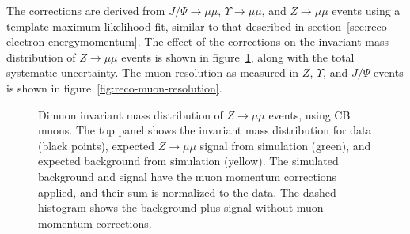 The corrections are derived from $J/\Psi\rightarrow\mu\mu$, $\Upsilon\rightarrow\mu\mu$, and $Z\rightarrow\mu\mu$ events using a template maximum likelihood fit, similar to that described in section~\ref{sec:reco-electron-energymomentum}. The effect of the corrections on the invariant mass distribution of $Z\rightarrow\mu\mu$ events is shown in figure~\ref{fig:reco-muon-momentum-corrections}, along with the total systematic uncertainty. The muon resolution as measured in $Z$, $\Upsilon$, and $J/\Psi$ events is shown in figure~\ref{fig:reco-muon-resolution}.

\begin{figure}[htbp]
	\centering
	\caption{Dimuon invariant mass distribution of $Z\rightarrow\mu\mu$ events, using CB muons. The top panel shows the invariant mass distribution for data (black points), expected $Z\rightarrow\mu\mu$ signal from simulation (green), and expected background from simulation (yellow). The simulated background and signal have the muon momentum corrections applied, and their sum is normalized to the data. The dashed histogram shows the background plus signal without muon momentum corrections.}
	\label{fig:reco-muon-momentum-corrections}
\end{figure}

